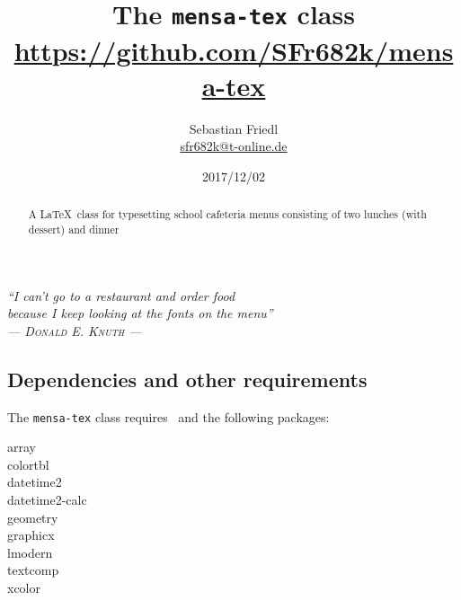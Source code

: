 \documentclass[11pt]{ltxdoc}
\title{The \texttt{mensa-tex} class \\ {\large\url{https://github.com/SFr682k/mensa-tex}}}
\author{Sebastian Friedl \\ \href{mailto:sfr682k@t-online.de}{\ttfamily sfr682k@t-online.de}}
\date{2017/12/02}
\begin{document}
	\maketitle
	\thispagestyle{empty}
	
	\begin{center} \itshape
		\enquote{I can't go to a restaurant and order food \\ because I keep looking at the fonts on the menu} \\
		--- \textsc{\upshape Donald E. Knuth} ---
	\end{center}
	
	\medskip
	\begin{abstract}
		\noindent%
		A \LaTeX\ class for typesetting school cafeteria menus consisting of two lunches (with dessert) and dinner
	\end{abstract}
	
	
	\tableofcontents
	
	\clearpage
	
	

	\subsection*{Dependencies and other requirements}
	The \texttt{mensa-tex} class requires \LaTeXe\ and the following packages:
	\begin{multicols}{3}\ttfamily\centering
		array \\ colortbl \\ datetime2 \\ datetime2-calc \\ geometry \\ graphicx \\ lmodern \\ textcomp \\ xcolor
	\end{multicols}
	
	
\end{document}

